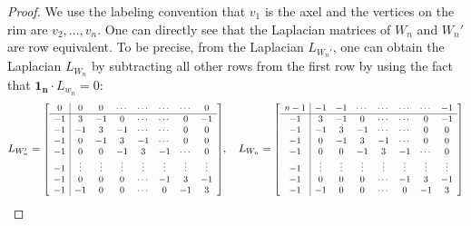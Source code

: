 \documentclass[11pt,reqno]{amsart}
\newcommand\scalemath[2]{\scalebox{#1}{\mbox{\ensuremath{\displaystyle #2}}}}
\theoremstyle{definition}
\theoremstyle{plain}
\begin{document}
\begin{proof}
We use the labeling convention that $v_1$ is the axel and the vertices on the rim are $v_2, \dots, v_{n}$. One can directly see that the Laplacian matrices of $W_n$ and $W_n'$ are row equivalent. To be precise, from the Laplacian $L_{W_n'}$, one can obtain the Laplacian $L_{W_n}$ by subtracting all other rows from the first row by using the fact that $\mathbf{1_n} \cdot L_{w_n} = 0$:
\begin{equation*}
L_{W_n'} = \scalemath{0.85}{
\left[
\begin{array}{c|ccccccc}
0 & 0 & 0 & \cdots & \cdots & \cdots & \cdots & 0 \\
\hline
-1 & 3 & -1 & 0 & \cdots & \cdots & 0 & -1 \\
-1 & - 1& 3 & -1 & \cdots & \cdots & 0 & 0 \\
-1 & 0 & - 1& 3 & -1 & \cdots & 0 & 0 \\
-1 & 0 & 0 & - 1& 3 & -1 & \cdots & 0 \\
-1 & \vdots & \vdots &\vdots & \vdots&\vdots &\vdots & \vdots\\
-1 & 0 & 0 & 0 & \cdots & -1& 3 & -1 \\
-1 & -1 & 0 & 0 & \cdots& 0 & -1 & 3 
\end{array}
\right]}, \quad 
L_{W_n} =\scalemath{0.85}{
\left[
\begin{array}{c|cccccccc}
n-1 & -1 & -1 & \cdots & \cdots & \cdots & \cdots & -1 \\
\hline
-1 & 3 & -1 & 0 & \cdots & \cdots & 0 & -1 \\
-1 & - 1& 3 & -1 & \cdots & \cdots & 0 & 0 \\
-1 & 0 & - 1& 3 & -1 & \cdots & 0 & 0 \\
-1 & 0 & 0 & - 1& 3 & -1 & \cdots & 0 \\
-1 & \vdots & \vdots &\vdots & \vdots&\vdots &\vdots & \vdots\\
-1 & 0 & 0 & 0 & \cdots & -1& 3 & -1 \\
-1 & -1 & 0 & 0 & \cdots& 0 & -1 & 3 
\end{array}
\right]}
\end{equation*}

\end{proof}
\end{document}
